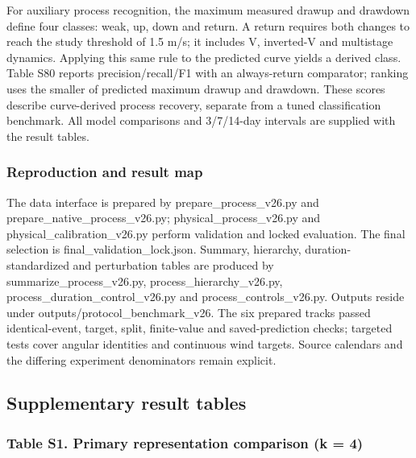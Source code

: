 \documentclass[a4paper,11pt]{article}
\begin{document}
For auxiliary process recognition, the maximum measured drawup and drawdown define four classes: weak, up, down and return. A return requires both changes to reach the study threshold of 1.5 m/s; it includes V, inverted-V and multistage dynamics. Applying this same rule to the predicted curve yields a derived class. Table S80 reports precision/recall/F1 with an always-return comparator; ranking uses the smaller of predicted maximum drawup and drawdown. These scores describe curve-derived process recovery, separate from a tuned classification benchmark. All model comparisons and 3/7/14-day intervals are supplied with the result tables.

\subsubsection{Reproduction and result map}\label{reproduction-and-result-map}

The data interface is prepared by prepare\_\allowbreak{}process\_\allowbreak{}v26.py and prepare\_\allowbreak{}native\_\allowbreak{}process\_\allowbreak{}v26.py; physical\_\allowbreak{}process\_\allowbreak{}v26.py and physical\_\allowbreak{}calibration\_\allowbreak{}v26.py perform validation and locked evaluation. The final selection is final\_\allowbreak{}validation\_\allowbreak{}lock.json. Summary, hierarchy, duration-standardized and perturbation tables are produced by summarize\_\allowbreak{}process\_\allowbreak{}v26.py, process\_\allowbreak{}hierarchy\_\allowbreak{}v26.py, process\_\allowbreak{}duration\_\allowbreak{}control\_\allowbreak{}v26.py and process\_\allowbreak{}controls\_\allowbreak{}v26.py. Outputs reside under outputs/protocol\_\allowbreak{}benchmark\_\allowbreak{}v26. The six prepared tracks passed identical-event, target, split, finite-value and saved-prediction checks; targeted tests cover angular identities and continuous wind targets. Source calendars and the differing experiment denominators remain explicit.

\subsection{Supplementary result tables}\label{supplementary-result-tables}

\subsubsection{Table S1. Primary representation comparison (k = 4)}\label{table-s1.-primary-representation-comparison-k-4}
\end{document}
